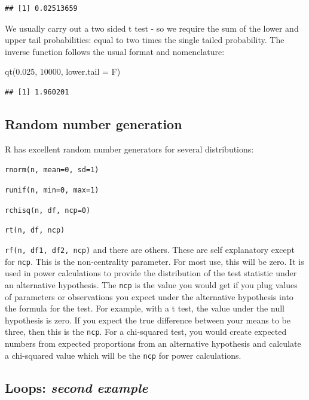 \documentclass[
]{book}
\newenvironment{Shaded}{\begin{snugshade}}{\end{snugshade}}
\newcommand{\AttributeTok}[1]{\textcolor[rgb]{0.77,0.63,0.00}{#1}}
\newcommand{\DecValTok}[1]{\textcolor[rgb]{0.00,0.00,0.81}{#1}}
\newcommand{\FloatTok}[1]{\textcolor[rgb]{0.00,0.00,0.81}{#1}}
\newcommand{\FunctionTok}[1]{\textcolor[rgb]{0.00,0.00,0.00}{#1}}
\newcommand{\NormalTok}[1]{#1}
\begin{document}
\begin{verbatim}
## [1] 0.02513659
\end{verbatim}

We usually carry out a two sided t test - so we require the sum of the lower and upper tail probabilities: equal to two times the single tailed probability. The inverse function follows the usual format and nomenclature:

\begin{Shaded}
\begin{Highlighting}[]
\FunctionTok{qt}\NormalTok{(}\FloatTok{0.025}\NormalTok{, }\DecValTok{10000}\NormalTok{, }\AttributeTok{lower.tail =}\NormalTok{ F)}
\end{Highlighting}
\end{Shaded}

\begin{verbatim}
## [1] 1.960201
\end{verbatim}

\hypertarget{random-number-generation}{%
\subsection{Random number generation}\label{random-number-generation}}

R has excellent random number generators for several distributions:

\texttt{rnorm(n,\ mean=0,\ sd=1)}

\texttt{runif(n,\ min=0,\ max=1)}

\texttt{rchisq(n,\ df,\ ncp=0)}

\texttt{rt(n,\ df,\ ncp)}

\texttt{rf(n,\ df1,\ df2,\ ncp)}
and there are others. These are self explanatory except for \texttt{ncp}. This is the non-centrality parameter. For most use, this will be zero. It is used in power calculations to provide the distribution of the test statistic under an alternative hypothesis. The \texttt{ncp} is the value you would get if you plug values of parameters or observations you expect under the alternative hypothesis into the formula for the test. For example, with a t test, the value under the null hypothesis is zero. If you expect the true difference between your means to be three, then this is the \texttt{ncp}. For a chi-squared test, you would create expected numbers from expected proportions from an alternative hypothesis and calculate a chi-squared value which will be the \texttt{ncp} for power calculations.

\hypertarget{loops-second-example}{%
\subsection{\texorpdfstring{Loops: \emph{second example}}{Loops: second example}}\label{loops-second-example}}
\end{document}
